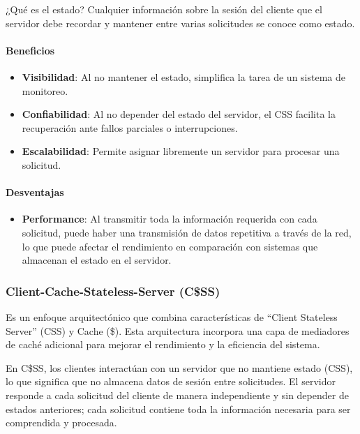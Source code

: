 \documentclass{article}
\begin{document}
		¿Qué es el estado? Cualquier información sobre la sesión del cliente que el servidor debe recordar y mantener entre varias solicitudes se conoce como estado.
		
		
		\paragraph{Beneficios}
		\begin{itemize}	
			\item {\textbf{Visibilidad}}: Al no mantener el estado, simplifica la tarea de un sistema de monitoreo.
			
			\item {\textbf{Confiabilidad}}: Al no depender del estado del servidor, el CSS facilita la recuperación ante fallos parciales o interrupciones.
			
			\item {\textbf{Escalabilidad}}: Permite asignar libremente un servidor para procesar una solicitud.	
			
		\end{itemize}
		
		\paragraph{Desventajas}
		\begin{itemize}
			\item {\textbf{Performance}}: Al transmitir toda la información requerida con cada solicitud, puede haber una transmisión de datos repetitiva a través de la red, lo que puede afectar el rendimiento en comparación con sistemas que almacenan el estado en el servidor.
			
		\end{itemize}
		
		\subsubsection{Client-Cache-Stateless-Server (C\$SS)}
		Es un enfoque arquitectónico que combina características de ``Client Stateless Server'' (CSS) y Cache (\$). Esta arquitectura incorpora una capa de mediadores de caché adicional para mejorar el rendimiento y la eficiencia del sistema.
		
		En C\$SS, los clientes interactúan con un servidor que no mantiene estado (CSS), lo que significa que no almacena datos de sesión entre solicitudes. El servidor responde a cada solicitud del cliente de manera independiente y sin depender de estados anteriores; cada solicitud contiene toda la información necesaria para ser comprendida y procesada.
		
\end{document}
